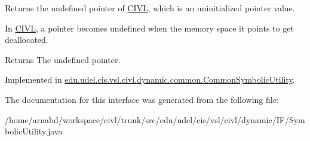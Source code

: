 Returns the undefined pointer of \hyperlink{classedu_1_1udel_1_1cis_1_1vsl_1_1civl_1_1CIVL}{C\+I\+V\+L}, which is an uninitialized pointer value. 

In \hyperlink{classedu_1_1udel_1_1cis_1_1vsl_1_1civl_1_1CIVL}{C\+I\+V\+L}, a pointer becomes undefined when the memory space it points to get deallocated.

\begin{DoxyReturn}{Returns}
The undefined pointer. 
\end{DoxyReturn}


Implemented in \hyperlink{classedu_1_1udel_1_1cis_1_1vsl_1_1civl_1_1dynamic_1_1common_1_1CommonSymbolicUtility_ab0ce2de739a46abc3ade425833b718ae}{edu.\+udel.\+cis.\+vsl.\+civl.\+dynamic.\+common.\+Common\+Symbolic\+Utility}.



The documentation for this interface was generated from the following file\+:\begin{DoxyCompactItemize}
\item 
/home/arnabd/workspace/civl/trunk/src/edu/udel/cis/vsl/civl/dynamic/\+I\+F/Symbolic\+Utility.\+java\end{DoxyCompactItemize}
